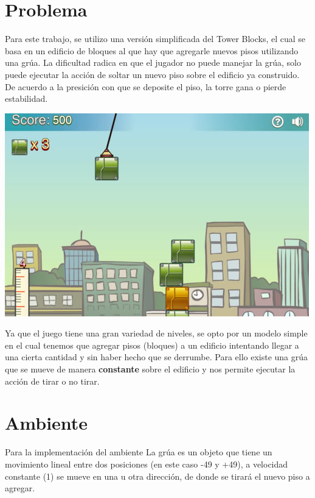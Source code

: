 \documentclass[11pt, a4paper]{article}
\begin{document}
	\maketitle

\section{Problema}
Para este trabajo, se utilizo una versi\'on simplificada del Tower Blocks, el cual se basa en un edificio de bloques al que hay que agregarle nuevos pisos utilizando una gr\'ua. La dificultad radica en que el jugador no puede manejar la gr\'ua, solo puede ejecutar la acci\'on de soltar un nuevo piso sobre el edificio ya construido. De acuerdo a la presici\'on con que se deposite el piso, la torre gana o pierde estabilidad. 
\begin{center} \includegraphics[scale=0.50]{towerblocks}\end{center}

Ya que el juego tiene una gran variedad de niveles, se opto por un modelo simple en el cual tenemos que agregar pisos (bloques) a un edificio intentando llegar a una cierta cantidad y sin haber hecho que se derrumbe. Para ello existe una gr\'ua que se mueve de manera \textbf{constante} sobre el edificio y nos permite ejecutar la acci\'on de tirar o no tirar.

\section{Ambiente}
Para la implementaci\'on del ambiente
La grúa es un objeto que tiene un movimiento lineal entre dos posiciones (en este caso -49 y +49), a velocidad constante (1) se mueve en una u otra dirección, de donde se tirará el nuevo piso a agregar. 
\end{document}
